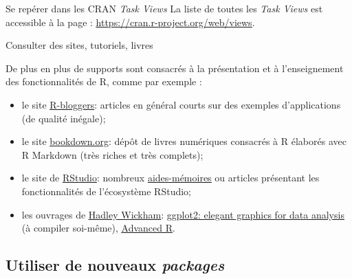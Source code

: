 \documentclass[12pt,ignorenonframetext,]{beamer}
\begin{document}
\begin{frame}{Se repérer dans les CRAN \protect\textit{Task Views}}
\pause \bigskip \normalsize
La liste de toutes les \emph{Task Views} est accessible à la page :
\href{https://cran.r-project.org/web/views}{\underline{https://cran.r-project.org/web/views}}.

\end{frame}

\begin{frame}{Consulter des sites, tutoriels, livres}

De plus en plus de supports sont consacrés à la présentation et à
l'enseignement des fonctionnalités de R, comme par exemple :

\begin{itemize}
\item
  \pause le site
  \href{https://www.r-bloggers.com}{\underline{R-bloggers}}: articles en
  général courts sur des exemples d'applications (de qualité inégale);
\item
  \pause le site \href{https://bookdown.org}{\underline{bookdown.org}}:
  dépôt de livres numériques consacrés à R élaborés avec R Markdown
  (très riches et très complets);
\item
  \pause le site de \href{https://www.rstudio.com}{\underline{RStudio}}:
  nombreux
  \href{https://www.rstudio.com/resources/cheatsheets/}{\underline{aides-mémoires}}
  ou articles présentant les fonctionnalités de l'écosystème RStudio;
\item
  \pause les ouvrages de
  \href{http://hadley.nz}{\underline{Hadley Wickham}}:
  \href{https://github.com/hadley/ggplot2-book}{\underline{ggplot2: elegant graphics for data analysis}}
  (à compiler soi-même),
  \href{http:/:adv-r.had.co.nz}{\underline{Advanced R}}.
\end{itemize}

\end{frame}

\subsection{\texorpdfstring{Utiliser de nouveaux
\protect\textit{packages}}{Utiliser de nouveaux }}\label{utiliser-de-nouveaux}
\end{document}
